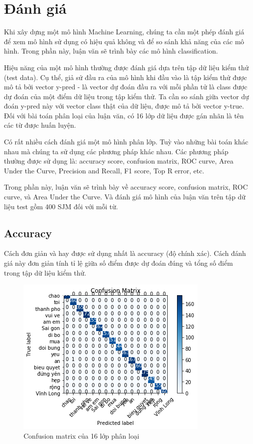 \section{Đánh giá}
Khi xây dựng một mô hình Machine Learning, chúng ta cần một phép đánh giá để xem mô hình sử dụng có hiệu quả không và để so sánh khả năng của các mô hình. Trong phần này, luận văn sẽ trình bày các mô hình classification.

Hiệu năng của một mô hình thường được đánh giá dựa trên tập dữ liệu kiểm thử (test data). Cụ thể, giả sử đầu ra của mô hình khi đầu vào là tập kiểm thử được mô tả bởi vector y-pred - là vector dự đoán đầu ra với mỗi phần tử là class được dự đoán của một điểm dữ liệu trong tập kiểm thử. Ta cần so sánh giữa vector dự đoán y-pred này với vector class thật của dữ liệu, được mô tả bởi vector y-true. Đối với bài toán phân loại của luận văn, có 16 lớp dữ liệu được gán nhãn là tên các từ được huấn luyện.


Có rất nhiều cách đánh giá một mô hình phân lớp. Tuỳ vào những bài toán khác nhau mà chúng ta sử dụng các phương pháp khác nhau. Các phương pháp thường được sử dụng là: accuracy score, confusion matrix, ROC curve, Area Under the Curve, Precision and Recall, F1 score, Top R error, etc.

Trong phần này, luận văn sẽ trình bày về accuracy score, confusion matrix, ROC curve, và Area Under the Curve. Và đánh giá mô hình của luận văn trên tập dữ liệu test gồm 400 SJM đối với mỗi từ.

\subsection{Accuracy}
Cách đơn giản và hay được sử dụng nhất là accuracy (độ chính xác). Cách đánh giá này đơn giản tính tỉ lệ giữa số điểm được dự đoán đúng và tổng số điểm trong tập dữ liệu kiểm thử.
\FloatBarrier
\begin{figure}[htp]
\begin{center}
\includegraphics[scale=1]{chap5/c5_figs/confusion_matrix.png}
\end{center}
\caption{Confusion matrix của 16 lớp phân loại}
\label{fig:pipelineS}
\end{figure}
\FloatBarrier